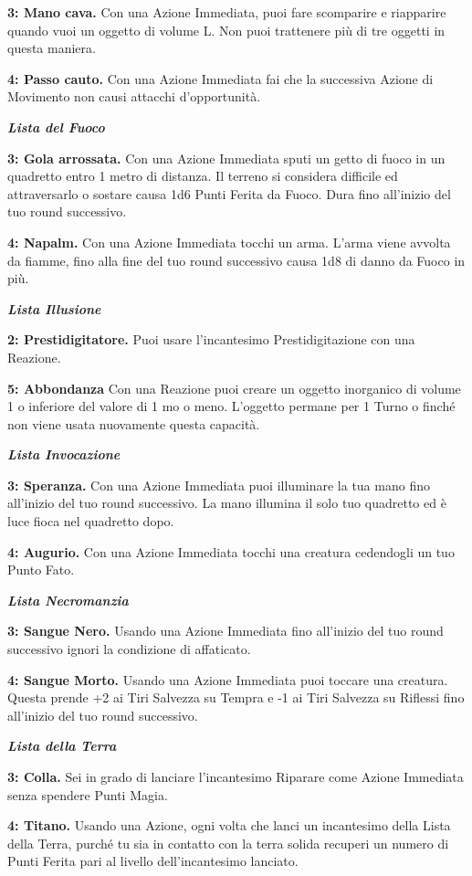 \begin{multicols}{2}
\textbf{3: Mano cava.} Con una Azione Immediata, puoi fare scomparire e riapparire quando vuoi un oggetto di volume L. Non puoi trattenere più di tre oggetti in questa maniera.

\textbf{4: Passo cauto.} Con una Azione Immediata fai che la successiva Azione di Movimento non causi attacchi d'opportunità.

\emph{\textbf{Lista del Fuoco}}

\textbf{3: Gola arrossata.} Con una Azione Immediata sputi un getto di fuoco in un quadretto entro 1 metro di distanza. Il terreno si considera difficile ed attraversarlo o sostare causa 1d6 Punti Ferita da Fuoco. Dura fino all'inizio del tuo round successivo.

\textbf{4: Napalm.} Con una Azione Immediata tocchi un arma. L'arma viene avvolta da fiamme, fino alla fine del tuo round successivo causa 1d8 di danno da Fuoco in più.

\emph{\textbf{Lista Illusione}}

\textbf{2: Prestidigitatore.} Puoi usare l'incantesimo Prestidigitazione con una Reazione.

\textbf{5: Abbondanza} Con una Reazione puoi creare un oggetto inorganico di volume 1 o inferiore del valore di 1 mo o meno. L'oggetto permane per 1 Turno o finché non viene usata nuovamente questa capacità.

\emph{\textbf{Lista Invocazione}}

\textbf{3: Speranza.} Con una Azione Immediata puoi illuminare la tua mano fino all'inizio del tuo round successivo. La mano illumina il solo tuo quadretto ed è luce fioca nel quadretto dopo.

\textbf{4: Augurio.} Con una Azione Immediata tocchi una creatura cedendogli un tuo Punto Fato.

\emph{\textbf{Lista Necromanzia}}

\textbf{3: Sangue Nero.} Usando una Azione Immediata fino all'inizio del tuo round successivo ignori la condizione di affaticato.

\textbf{4: Sangue Morto.} Usando una Azione Immediata puoi toccare una creatura. Questa prende +2 ai Tiri Salvezza su Tempra e -1 ai Tiri Salvezza su Riflessi fino all'inizio del tuo round successivo.

\emph{\textbf{Lista della Terra}}

\textbf{3: Colla.} Sei in grado di lanciare l'incantesimo Riparare come Azione Immediata senza spendere Punti Magia.

\textbf{4: Titano.} Usando una Azione, ogni volta che lanci un incantesimo della Lista della Terra, purché tu sia in contatto con la terra solida recuperi un numero di Punti Ferita pari al livello dell'incantesimo lanciato.


\end{multicols}
